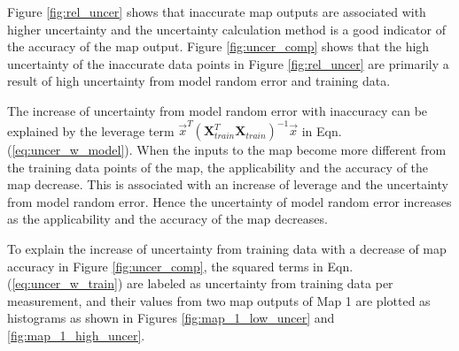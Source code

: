 Figure \ref{fig:rel_uncer} shows that inaccurate map outputs are associated with higher uncertainty and the uncertainty calculation method is a good indicator of the accuracy of the map output. Figure \ref{fig:uncer_comp} shows that the high uncertainty of the inaccurate data points in Figure \ref{fig:rel_uncer} are primarily a result of high uncertainty from model random error and training data.

The increase of uncertainty from model random error with inaccuracy can be explained by the leverage term ${\vec x^T}{({\mathbf{X}}_{train}^T{{\mathbf{X}}_{train}})^{ - 1}}\vec x$ in Eqn. (\ref{eq:uncer_w_model}). When the inputs to the map become more different from the training data points of the map, the applicability and the accuracy of the map decrease. This is associated with an increase of leverage and the uncertainty from model random error. Hence the uncertainty of model random error increases as the applicability and the accuracy of the map decreases.

To explain the increase of uncertainty from training data with a decrease of map accuracy in Figure \ref{fig:uncer_comp}, the squared terms in Eqn. (\ref{eq:uncer_w_train}) are labeled as uncertainty from training data per measurement, and their values from two map outputs of Map 1 are plotted as histograms as shown in Figures \ref{fig:map_1_low_uncer} and \ref{fig:map_1_high_uncer}.

